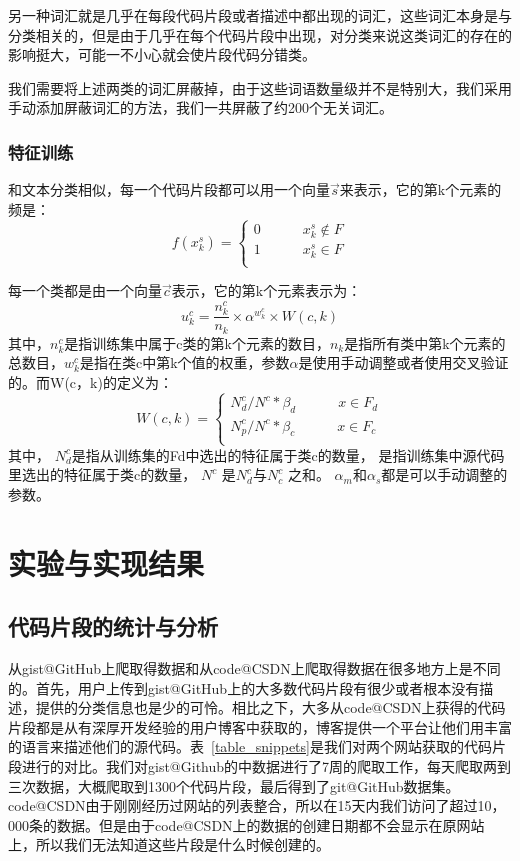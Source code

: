\documentclass[10pt,journal,draftcls,onecolumn]{IEEEtran}
\begin{document}
\begin{CJK*}{UTF8}{gbsn}
另一种词汇就是几乎在每段代码片段或者描述中都出现的词汇，这些词汇本身是与分类相关的，但是由于几乎在每个代码片段中出现，对分类来说这类词汇的存在的影响挺大，可能一不小心就会使片段代码分错类。

我们需要将上述两类的词汇屏蔽掉，由于这些词语数量级并不是特别大，我们采用手动添加屏蔽词汇的方法，我们一共屏蔽了约200个无关词汇。

\subsubsection{特征训练}
和文本分类相似，每一个代码片段都可以用一个向量$\vec{s}$来表示，它的第k个元素的频是：
\begin{equation}\label{equation_element1}
f(x_k^s)=\begin{cases}
    0 \quad \quad \quad  x_k^s\not\in F \\
    1 \quad \quad \quad  x_k^s\in F \\
  \end{cases}
\end{equation} 

每一个类都是由一个向量$\vec{c}$表示，它的第k个元素表示为：
 \begin{equation}\label{equation_element2}
u_k^c=\frac{n_k^c}{n_k}\times \alpha^{w_k^c}\times W(c,k)
\end{equation}
其中，$n_k^c$是指训练集中属于c类的第k个元素的数目，$n_k$是指所有类中第k个元素的总数目，$w_k^c$是指在类c中第k个值的权重，参数$\alpha$是使用手动调整或者使用交叉验证的。而W(c，k)的定义为：
\begin{equation}\label{equation_w}
W(c,k)=\begin{cases}
    N_d^c/N^c*\beta_d \quad \quad \quad  x\in F_d  \\
    N_p^c/N^c*\beta_c \quad \quad \quad  x\in F_c  \\
  \end{cases}
\end{equation}
其中， $N_d^c$是指从训练集的Fd中选出的特征属于类c的数量， 是指训练集中源代码里选出的特征属于类c的数量， $N^c$ 是$N_d^c$与$N_c^c$ 之和。 $\alpha_m$和$\alpha_s$都是可以手动调整的参数。


\section{实验与实现结果}
\subsection{代码片段的统计与分析}
从gist@GitHub上爬取得数据和从code@CSDN上爬取得数据在很多地方上是不同的。首先，用户上传到gist@GitHub上的大多数代码片段有很少或者根本没有描述，提供的分类信息也是少的可怜。相比之下，大多从code@CSDN上获得的代码片段都是从有深厚开发经验的用户博客中获取的，博客提供一个平台让他们用丰富的语言来描述他们的源代码。表~\ref{table_snippets}是我们对两个网站获取的代码片段进行的对比。我们对gist@Github的中数据进行了7周的爬取工作，每天爬取两到三次数据，大概爬取到1300个代码片段，最后得到了git@GitHub数据集。code@CSDN由于刚刚经历过网站的列表整合，所以在15天内我们访问了超过10，000条的数据。但是由于code@CSDN上的数据的创建日期都不会显示在原网站上，所以我们无法知道这些片段是什么时候创建的。


\end{CJK*}
\end{document}
